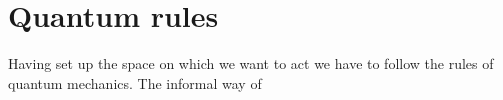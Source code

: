 \section{Quantum rules}
Having set up the space on which we want to act we have to follow the rules of quantum mechanics. The informal way of 
